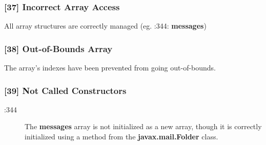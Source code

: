 \subsubsection{[37] Incorrect Array Access}
All array structures are correctly managed (eg. :344: \textbf{messages})

\subsubsection{[38] Out-of-Bounds Array}
The array's indexes have been prevented from going out-of-bounds.

\subsubsection{[39] Not Called Constructors}
\begin{description}
	\item[:344] The \textbf{messages} array is not initialized as a new array, though it is correctly initialized using a method from the \textbf{javax.mail.Folder} class.
\end{description}

